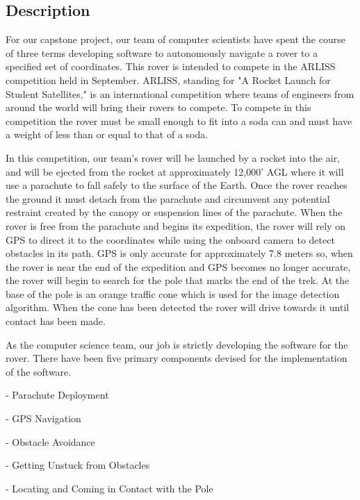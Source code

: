 \documentclass[10pt,letterpaper,onecolumn,draftclsnofoot,journal]{IEEEtran}
\begin{document}
\subsection{\textbf{Description}}
For our capstone project, our team of computer scientists have spent the course of three terms developing software to autonomously navigate a rover to a specified set of coordinates. This rover is intended to compete in the ARLISS competition held in September. ARLISS, standing for "A Rocket Launch for Student Satellites," is an international competition where teams of engineers from around the world will bring their rovers to compete. To compete in this competition the rover must be small enough to fit into a soda can and must have a weight of less than or equal to that of a soda.\vspace{.3cm}
\par
In this competition, our team's rover will be launched by a rocket into the air, and will be ejected from the rocket at approximately 12,000' AGL where it will use a parachute to fall safely to the surface of the Earth. Once the rover reaches the ground it must detach from the parachute and circumvent any potential restraint created by the canopy or suspension lines of the parachute. When the rover is free from the parachute and begins its expedition, the rover will rely on GPS to direct it to the coordinates while using the onboard camera to detect obstacles in its path. GPS is only accurate for approximately 7.8 meters so, when the rover is near the end of the expedition and GPS becomes no longer accurate, the rover will begin to search for the pole that marks the end of the trek. At the base of the pole is an orange traffic cone which is used for the image detection algorithm. When the cone has been detected the rover will drive towards it until contact has been made.\vspace{.3cm}
\par
As the computer science team, our job is strictly developing the software for the rover. There have been five primary components devised for the implementation of the software.\vspace{.3cm}
\par 
\hspace{.5cm} -\hspace{.3cm} Parachute Deployment\par
\hspace{.5cm} -\hspace{.3cm} GPS Navigation\par
\hspace{.5cm} -\hspace{.3cm} Obstacle Avoidance\par
\hspace{.5cm} -\hspace{.3cm} Getting Unstuck from Obstacles\par
\hspace{.5cm} -\hspace{.3cm} Locating and Coming in Contact with the Pole\vspace{.3cm}
\par 
\end{document}

